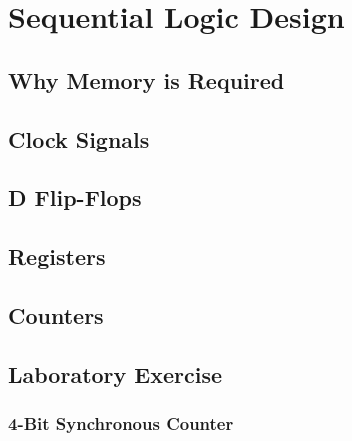 \chapter{Sequential Logic Design}

\section{Why Memory is Required}

\section{Clock Signals}

\section{D Flip-Flops}

\section{Registers}

\section{Counters}

\section{Laboratory Exercise}

\subsection*{4-Bit Synchronous Counter}
